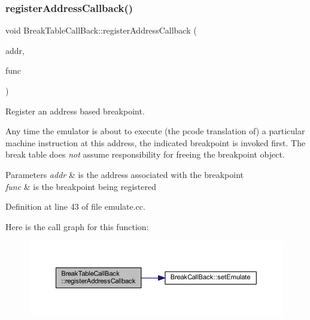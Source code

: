 \subsubsection{\texorpdfstring{registerAddressCallback()}{registerAddressCallback()}}
{\footnotesize\ttfamily void Break\+Table\+Call\+Back\+::register\+Address\+Callback (\begin{DoxyParamCaption}\item[{const \mbox{\hyperlink{class_address}{Address}} \&}]{addr,  }\item[{\mbox{\hyperlink{class_break_call_back}{Break\+Call\+Back}} $\ast$}]{func }\end{DoxyParamCaption})}



Register an address based breakpoint. 

Any time the emulator is about to execute (the pcode translation of) a particular machine instruction at this address, the indicated breakpoint is invoked first. The break table does {\itshape not} assume responsibility for freeing the breakpoint object. 
\begin{DoxyParams}{Parameters}
{\em addr} & is the address associated with the breakpoint \\
\hline
{\em func} & is the breakpoint being registered \\
\hline
\end{DoxyParams}


Definition at line 43 of file emulate.\+cc.

Here is the call graph for this function\+:
\nopagebreak
\begin{figure}[H]
\begin{center}
\leavevmode
\includegraphics[width=350pt]{class_break_table_call_back_a22f1cb661549be082a71edcca5eb7f5f_cgraph}
\end{center}
\end{figure}
\mbox{\label{class_break_table_call_back_a7c2ea1b2996ea556188e1c09a8f6ec1f}} 
